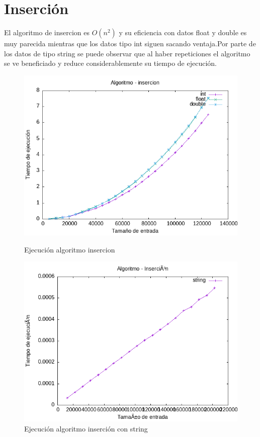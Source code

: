 \documentclass[11pt,openany]{book}
\begin{document}
\section*{Inserción}
El algoritmo de insercion es \(O(n^2)\) y su eficiencia con datos float y double es muy parecida mientras que los datos tipo int
siguen sacando ventaja.Por parte de los datos de tipo string se puede observar que al haber repeticiones el algoritmo se ve beneficiado y reduce
considerablemente su tiempo de ejecución.
\begin{figure}[H]
    \begin{minipage}{0.5\textwidth}
        \centering
        \includegraphics[width=\linewidth]{assets/Img/insercion.png}
        \caption{Ejecución algoritmo insercion}
        \label{fig:insercion}
    \end{minipage}%
    \begin{minipage}{0.5\textwidth}
        \centering
        \includegraphics[width=\linewidth]{assets/Img/insercionstring.png}
        \caption{Ejecución algoritmo inserción con string}
        \label{fig:insercionstring}
    \end{minipage}
\end{figure}
\end{document}
